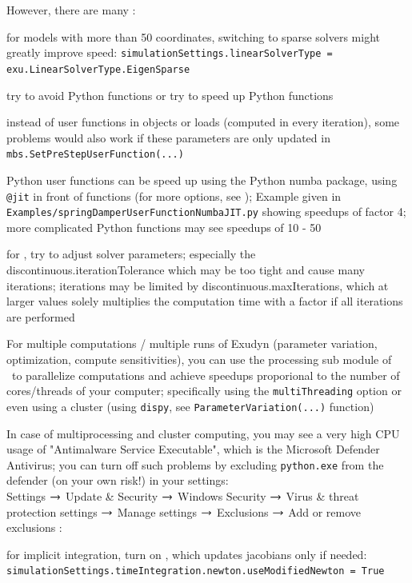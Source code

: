 \noindent However, there are many :
\bi
  \item for models with more than 50 coordinates, switching to sparse solvers might greatly improve speed: \texttt{simulationSettings.linearSolverType = exu.LinearSolverType.EigenSparse}
  \item try to avoid Python functions or try to speed up Python functions
  \item instead of user functions in objects or loads (computed in every iteration), some problems would also work if these parameters are only updated in \texttt{mbs.SetPreStepUserFunction(...)}
  \item Python user functions can be speed up using the Python numba package, using \texttt{@jit} in front of functions (for more options, see ); Example given in \texttt{Examples/springDamperUserFunctionNumbaJIT.py} showing speedups of factor 4; more complicated Python functions may see speedups of 10 - 50
  \item for , try to adjust solver parameters; especially the discontinuous.iterationTolerance which may be too tight and cause many iterations; iterations may be limited by discontinuous.maxIterations, which at larger values solely multiplies the computation time with a factor if all iterations are performed
  \item For multiple computations / multiple runs of Exudyn (parameter variation, optimization, compute sensitivities), you can use the processing sub module of \codeName\ to parallelize computations and achieve speedups proporional to the number of cores/threads of your computer; specifically using the \texttt{multiThreading} option or even using a cluster (using \texttt{dispy}, see \texttt{ParameterVariation(...)} function)
  \item In case of multiprocessing and cluster computing, you may see a very high CPU usage of "Antimalware Service Executable", which is the Microsoft Defender Antivirus; you can turn off such problems by excluding \texttt{python.exe} from the defender (on your own risk!) in your settings:\\
  Settings $\rightarrow$ Update \& Security $\rightarrow$ Windows Security $\rightarrow$ Virus \& threat protection settings $\rightarrow$ Manage settings $\rightarrow$ Exclusions $\rightarrow$ Add or remove exclusions 
\ei
{}:
\bi
  \item for implicit integration, turn on , which updates jacobians only if needed: \texttt{simulationSettings.timeIntegration.newton.useModifiedNewton = True}
